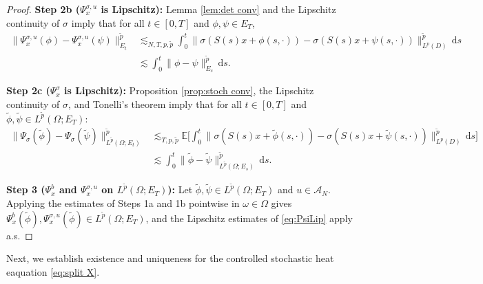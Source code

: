 \documentclass{amsart}
\theoremstyle{plain}
\theoremstyle{remark}
\theoremstyle{plain}
\numberwithin{equation}{section}
\newcommand{\E}{{\mathbb E}}
\newcommand{\Om}{\Omega}
\newcommand{\om}{\omega}
\newcommand{\A}{{\mathcal A}}
\newcommand{\dd}{\,\mathrm{d}}
\begin{document}
\begin{proof}
\textbf{Step 2b ($\Psi_x^{\sigma,u}$ is Lipschitz):}
Lemma \ref{lem:det conv} and the Lipschitz continuity of $\sigma$ imply that for all $t\in[0,T]$ and $\phi,\psi\in E_T$, 
\begin{align*}
    \|\Psi_x^{\sigma,u}(\phi)-\Psi_x^{\sigma,u}(\psi)\|_{E_t}^{\tilde p} &\lesssim_{N,T,p,\tilde p} \int_0^t \|\sigma(S(s)x+\phi(s,\cdot))-\sigma(S(s)x+\psi(s,\cdot))\|_{L^p(D)}^{\tilde p}\dd s\\
    &\lesssim \int_0^t \| \phi  - \psi  \|_{E_s}^{\tilde p}\dd s.
\end{align*} 


\textbf{Step 2c ($\Psi_x^{\sigma}$ is Lipschitz):}
Proposition \ref{prop:stoch conv}, the Lipschitz continuity of $\sigma$, and Tonelli's theorem imply that for all $t\in[0,T]$ and $\tilde \phi, \tilde\psi\in L^{\tilde p}(\Om;E_T)$: 
\begin{align*}
    \|\Psi_{\sigma}(\tilde\phi)-\Psi_{\sigma}(\tilde\psi)\|_{L^{\tilde p}(\Om;E_t)}^{\tilde p} &\lesssim_{T,p,\tilde p} 
     \E\Big[\int_0^t \|\sigma(S(s)x+\tilde\phi(s,\cdot))-\sigma(S(s)x+\tilde\psi(s,\cdot))\|_{L^p(D)}^{\tilde p}\dd s\Big]\\
     &\lesssim 
    \int_0^t \|\tilde\phi  -\tilde\psi \|_{L^{\tilde p}(\Om;E_s)}^{\tilde p}\dd s. 
\end{align*} 

\textbf{Step 3 ($\Psi_x^b$ and $\Psi_x^{\sigma,u}$ on $L^{\tilde p}(\Om;E_T)$):} 
Let $\tilde \phi,\tilde\psi\in L^{\tilde p}(\Om;E_T)$ and $u\in\A_N$. Applying the estimates of Steps 1a and 1b pointwise in $\om\in\Om$ gives $\Psi_x^b(\tilde\phi),\Psi_x^{\sigma,u}(\tilde\phi)\in L^{\tilde p}(\Om;E_T)$, and the Lipschitz estimates of \eqref{eq:PsiLip} apply a.s. 
\end{proof}
 

Next, we establish  existence and uniqueness for the controlled stochastic heat eaquation \eqref{eq:split X}. 
\end{document}
